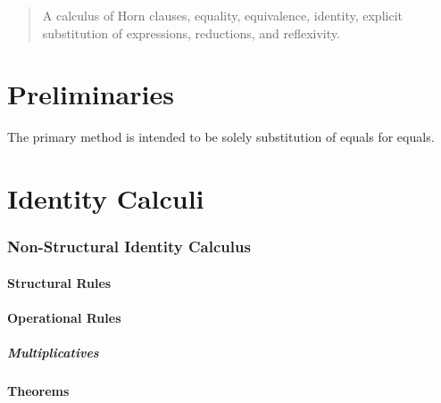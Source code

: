 \begin{abstract}
A calculus of Horn clauses, equality, equivalence, identity, explicit substitution of expressions, reductions, and reflexivity.
\end{abstract}

\part{Preliminaries}
\begin{center}
	\begin{flushleft}
		The primary method is intended to be solely substitution of equals for equals.
	\end{flushleft}
\end{center}

\newpage
\part{Identity Calculi}

\section{Non-Structural Identity Calculus}
\subsection{Structural Rules}

\subsection{Operational Rules}
\subsubsection{Multiplicatives}

\subsection{Theorems}
\begin{center}
	\begin{flushleft}
	\end{flushleft}
\end{center}